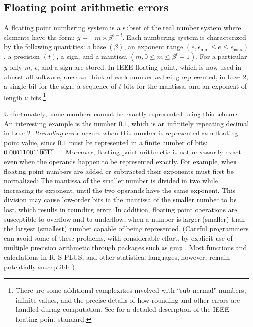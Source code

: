 \documentclass[11pt]{article}
\let\proglang=\textsf
\newcommand{\pkg}[1]{{\normalfont\fontseries{b}\selectfont #1}}
\begin{document}
\subsection{Floating point arithmetic errors} 
A floating point numbering system is a subset of the real number system where elements have the form: 
$y=\pm m \times \beta ^{e-t}$. Each numbering system is characterized by the following quantities: a 
base $\left( \beta \right) $, an exponent range $\left( e,e_{\min } \leq e\leq e_{\max } \right) $, a
precision $\left( t\right)$, a sign, and a mantissa $\left(m,0\leq m\leq \beta^{t}-1\right)$.
For a particular \emph{y} only \emph{m}, \emph{e}, and a sign are stored. In IEEE floating point,
which is now used in almost all software, one can think of each number as being represented, in base 2, 
a single bit for the sign, a sequence of $t$ bits for the mantissa, and an exponent of length $e$ 
	bits.\footnote{There are some additional complexities involved with ``sub-normal'' numbers, 
	infinite values, and the precise details of how rounding and other errors are handled during 
	computation. See \citet{Overton01} for a detailed description of the IEEE floating point standard.}

Unfortunately, some numbers cannot be exactly represented using this scheme. An interesting example 
is the number $0.1$, which is an infinitely repeating decimal in base 2. 
 \emph{Rounding} error occurs when this number is represented as a floating point value,
 since $0.1$ must be represented in a finite number of bits: ${\rm 0}{\rm .000110011}\overline {{\rm 0011}}\ldots$
Moreover, floating point arithmetic is not necessarily exact even when the operands happen to be represented exactly. For example, 
when floating point numbers are added or subtracted their exponents must first be normalized: The 
mantissa of the smaller number is divided in two while increasing its exponent, until the two 
operands have the same exponent. This division may cause low-order bits in the mantissa of the 
smaller number to be lost, which results in rounding error. In addition, floating point 
operations are susceptible to overflow and to underflow, when a number is larger (smaller) than the 
largest (smallest) number capable of being represented. (Careful programmers can avoid some
 of these problems, with considerable effort, by explicit use of multiple precision arithmetic 
 through packages such as \pkg{gmp} \citep{gmp07}. Most functions and calculations in \proglang{R}, \proglang{S-PLUS},
 and other statistical languages, however, remain potentially susceptible.) 
\end{document}
